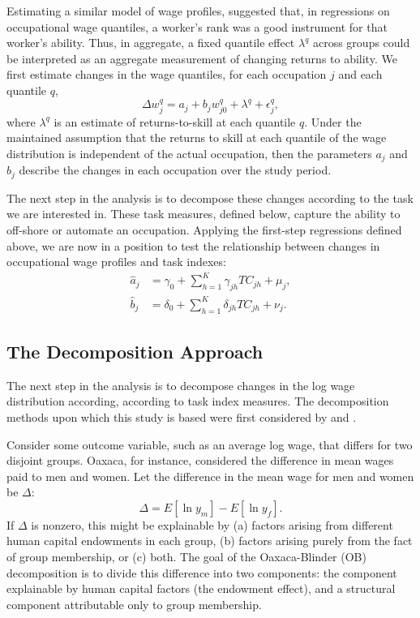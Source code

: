 Estimating a similar model of wage profiles, \citet{Juhn1993} suggested that, in regressions on occupational wage quantiles, a worker's rank was a good instrument for that worker's ability. Thus, in aggregate, a fixed quantile effect $\lambda^q$ across groups could be interpreted as an aggregate measurement of changing returns to ability. We first estimate changes in the wage quantiles, for each occupation $j$ and each quantile $q$,
\begin{equation} 
  \Delta w_j^q = a_j + b_jw_{j0}^q + \lambda^q + \epsilon^q_j, \label{eq:quantiles}
\end{equation}
where $\lambda^q$ is an estimate of returns-to-skill at each quantile $q$. Under the maintained assumption that the returns to skill at each quantile of the wage distribution is independent of the actual occupation, then the parameters $a_j$ and $b_j$ describe the changes in each occupation over the study period.

The next step in the analysis is to decompose these changes according to the task we are interested in. These task measures, defined below, capture the ability to off-shore or automate an occupation. Applying the first-step regressions defined above, we are now in a position to test the relationship between changes in occupational wage profiles and task indexes:
\begin{align}
  \hat{a}_j &= \gamma_0 + \sum_{h=1}^K\gamma_{jh}TC_{jh} + \mu_j, \label{eq:aeq} \\
  \hat{b}_j &= \delta_0 + \sum_{h=1}^K\delta_{jh}TC_{jh} + \nu_j. \label{eq:beq}
\end{align}
\subsection{The Decomposition Approach}
The next step in the analysis is to decompose changes in the log wage distribution according, according to task index measures. The decomposition methods upon which this study is based were first considered by \citet{Oaxaca1973} and \citet{Blinder1973}. 

Consider some outcome variable, such as an average log wage, that differs for two disjoint groups. Oaxaca, for instance, considered the difference in mean wages paid to men and women. Let the difference in the mean wage for men and women be $\Delta$:
\begin{equation} \Delta = E[\ln y_m] - E[\ln y_f]. \label{eq:odec} \end{equation}
If $\Delta$ is nonzero, this might be explainable by (a) factors arising from different human capital endowments in each group, (b) factors arising purely from the fact of group membership, or (c) both. The goal of the Oaxaca-Blinder (OB) decomposition is to divide this difference into two components: the component explainable by human capital factors (the endowment effect), and a structural component attributable only to group membership.

